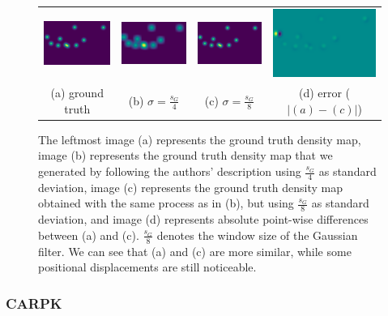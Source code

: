 \begin{figure}[htb]
	\centering
	\begin{tabular}{cccc}
		\includegraphics[width=0.24\linewidth]{fig/df_gt.png} &
		\includegraphics[width=0.24\linewidth]{fig/df_wrong.png} &
		\includegraphics[width=0.24\linewidth]{fig/df_our.png} &
		\includegraphics[width=0.24\linewidth]{fig/dm_diff.png} \\
		(a) ground truth & (b) $\sigma = \frac{s_G}{4}$ & (c) $\sigma = \frac{s_G}{8}$ & (d) error ($|(a) - (c)|$) \\
	\end{tabular}
	\caption{The leftmost image (a) represents the ground truth density map, image (b) represents the ground truth density map that we generated by following the authors' description using $\frac{s_G}{4}$ as standard deviation, image (c) represents the ground truth density map obtained with the same process as in (b), but using $\frac{s_G}{8}$ as standard deviation, and image (d) represents absolute point-wise differences between (a) and (c). $\frac{s_G}{8}$ denotes the window size of the Gaussian filter. We can see that (a) and (c) are more similar, while some positional displacements are still noticeable.}
	\label{fig:densitymaps}
\end{figure}

\subsubsection{CARPK}
\label{sec:carpk}

